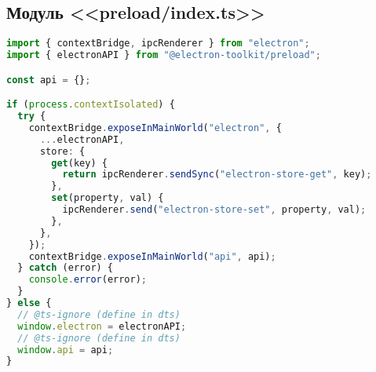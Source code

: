 \subsection{Модуль <<preload/index.ts>>}
\begin{lstlisting}[language=typescript]
import { contextBridge, ipcRenderer } from "electron";
import { electronAPI } from "@electron-toolkit/preload";

const api = {};

if (process.contextIsolated) {
  try {
    contextBridge.exposeInMainWorld("electron", {
      ...electronAPI,
      store: {
        get(key) {
          return ipcRenderer.sendSync("electron-store-get", key);
        },
        set(property, val) {
          ipcRenderer.send("electron-store-set", property, val);
        },
      },
    });
    contextBridge.exposeInMainWorld("api", api);
  } catch (error) {
    console.error(error);
  }
} else {
  // @ts-ignore (define in dts)
  window.electron = electronAPI;
  // @ts-ignore (define in dts)
  window.api = api;
}
\end{lstlisting}
